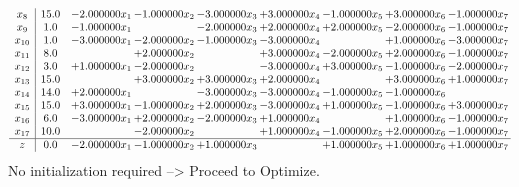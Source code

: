\documentclass[10pt]{article}
\begin{document}
\[\begin{array}{c| c c@{\hskip 2pt} c@{\hskip 2pt} c@{\hskip 2pt} c@{\hskip 2pt} c@{\hskip 2pt} c@{\hskip 2pt} c@{\hskip 2pt} }
 x_{8}   &  15.0 & -2.000000 x_{1} & -1.000000 x_{2} & -3.000000 x_{3} & + 3.000000 x_{4} & -1.000000 x_{5} & + 3.000000 x_{6} & -1.000000 x_{7}\\
 x_{9}   &  1.0 & -1.000000 x_{1} &   & -2.000000 x_{3} & + 2.000000 x_{4} & + 2.000000 x_{5} & -2.000000 x_{6} & -1.000000 x_{7}\\
 x_{10}   &  1.0 & -3.000000 x_{1} & -2.000000 x_{2} & -1.000000 x_{3} & -3.000000 x_{4} &   & + 1.000000 x_{6} & -3.000000 x_{7}\\
 x_{11}   &  8.0  &   & + 2.000000 x_{2} &   & + 3.000000 x_{4} & -2.000000 x_{5} & + 2.000000 x_{6} & -1.000000 x_{7}\\
 x_{12}   &  3.0 & + 1.000000 x_{1} & -2.000000 x_{2} &   & -3.000000 x_{4} & + 3.000000 x_{5} & -1.000000 x_{6} & -2.000000 x_{7}\\
 x_{13}   &  15.0  &   & + 3.000000 x_{2} & + 3.000000 x_{3} & + 2.000000 x_{4} &   & + 3.000000 x_{6} & + 1.000000 x_{7}\\
 x_{14}   &  14.0 & + 2.000000 x_{1} &   & -3.000000 x_{3} & -3.000000 x_{4} & -1.000000 x_{5} & -1.000000 x_{6} &   \\
 x_{15}   &  15.0 & + 3.000000 x_{1} & -1.000000 x_{2} & + 2.000000 x_{3} & -3.000000 x_{4} & + 1.000000 x_{5} & -1.000000 x_{6} & + 3.000000 x_{7}\\
 x_{16}   &  6.0 & -3.000000 x_{1} & + 2.000000 x_{2} & -2.000000 x_{3} & + 1.000000 x_{4} &   & + 1.000000 x_{6} & -1.000000 x_{7}\\
 x_{17}   &  10.0  &   & -2.000000 x_{2} &   & + 1.000000 x_{4} & -1.000000 x_{5} & + 2.000000 x_{6} & -1.000000 x_{7}\\
\hline
z    &  0.0 & -2.000000 x_{1} & -1.000000 x_{2} & + 1.000000 x_{3} &   & + 1.000000 x_{5} & + 1.000000 x_{6} & + 1.000000 x_{7}\\
\end{array}\]
No initialization required --> Proceed to Optimize. 
\end{document}
